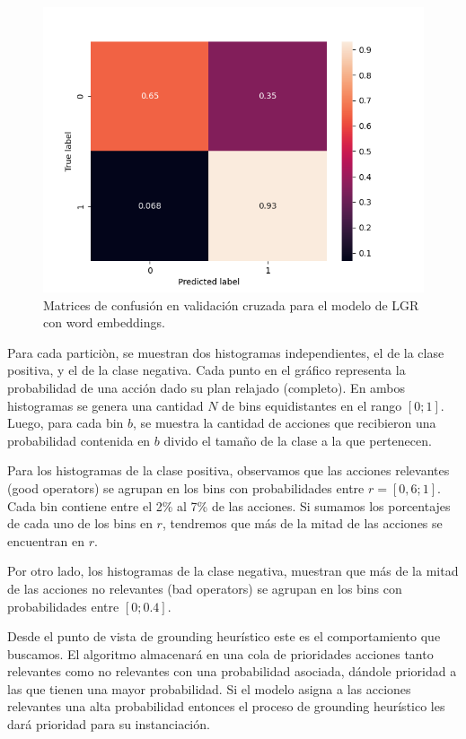 \begin{figure}[b!]
      \includegraphics[width=\linewidth]{figures/results/word_embeddings/lgr/take_image/lgr_set_5_confusion_matrix_percent.png}
    \endminipage
    \caption{Matrices de confusión en validación cruzada para el modelo de LGR con word embeddings.}
    \label{fig:takeimage-bestmodel-cm}
\end{figure}

Para cada particiòn, se muestran dos histogramas independientes, el de la clase
positiva, y el de la clase negativa. Cada punto en el gráfico representa la
probabilidad de una acción dado su plan relajado (completo). En ambos
histogramas se genera una cantidad $N$ de bins equidistantes en el rango
$[0;1]$. Luego, para cada bin $b$, se muestra la cantidad de acciones que
recibieron una probabilidad contenida en $b$ divido el tamaño de la clase a la
que pertenecen.

Para los histogramas de la clase positiva, observamos que las acciones
relevantes (good operators) se agrupan en los bins con probabilidades entre
$r=[0,6; 1]$. Cada bin contiene entre el 2\% al 7\% de las acciones. Si sumamos
los porcentajes de cada uno de los bins en $r$, tendremos que más de la mitad de
las acciones se encuentran en $r$.

Por otro lado, los histogramas de la clase negativa, muestran que más de la
mitad de las acciones no relevantes (bad operators) se agrupan en los bins con
probabilidades entre $[0;0.4]$.

Desde el punto de vista de grounding heurístico este es el comportamiento que
buscamos. El algoritmo almacenará en una cola de prioridades acciones tanto
relevantes como no relevantes con una probabilidad asociada, dándole prioridad a
las que tienen una mayor probabilidad. Si el modelo asigna a las acciones
relevantes una alta probabilidad entonces el proceso de grounding heurístico les
dará prioridad para su instanciación.

